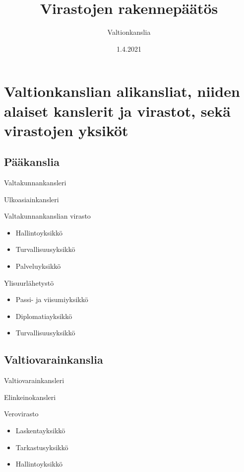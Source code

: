 \documentclass{article}
\title{Virastojen rakennepäätös}
\author{Valtionkanslia}
\date{1.4.2021}
\begin{document}
	
	\maketitle
	
	\newpage
	
	\section{Valtionkanslian alikansliat, niiden alaiset kanslerit ja virastot, sekä virastojen yksiköt}
	
	\renewcommand{\contentsname}{\large Sisällysluettelo}
	\tableofcontents
	
	\subsection{Pääkanslia}
	
	Valtakunnankansleri
	\vspace{12pt}
	
	Ulkoasiainkansleri
	\vspace{12pt}
	
	Valtakunnankanslian virasto
	\begin{itemize}
		\item Hallintoyksikkö
		\item Turvallisuusyksikkö
		\item Palveluyksikkö
	\end{itemize}
	\vspace{12pt}
	
	Ylisuurlähetystö
	\begin{itemize}
		\item Passi- ja viisumiyksikkö
		\item Diplomatiayksikkö
		\item Turvallisuusyksikkö
	\end{itemize}
	
	\subsection{Valtiovarainkanslia}
	Valtiovarainkansleri
	
	\vspace{12pt}
	
	Elinkeinokansleri
	\vspace{12pt}
	
	Verovirasto
	\begin{itemize}
		\item Laskentayksikkö
		\item Tarkastusyksikkö
		\item Hallintoyksikkö
	\end{itemize}
\end{document}
